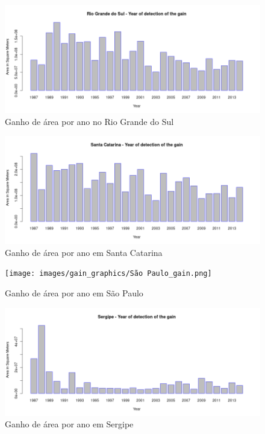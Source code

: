 \begin{figure}[H]
    \centering
    \includegraphics[scale=.5]{images/gain_graphics/Rio Grande do Sul_gain.png}
    \caption{Ganho de área por ano no Rio Grande do Sul}
    \label{fig:gain_rio_grande_do_sul}
\end{figure}

\begin{figure}[H]
    \centering
    \includegraphics[scale=.5]{images/gain_graphics/Santa Catarina_gain.png}
    \caption{Ganho de área por ano em Santa Catarina}
    \label{fig:gain_santa_catarina}
\end{figure}

\begin{figure}[H]
    \centering
    \texttt{[image: images/gain\_graphics/São Paulo\_gain.png]}
    \caption{Ganho de área por ano em São Paulo}
    \label{fig:gain_sao_paulo}
\end{figure}

\begin{figure}[H]
    \centering
    \includegraphics[scale=.5]{images/gain_graphics/Sergipe_gain.png}
    \caption{Ganho de área por ano em Sergipe}
    \label{fig:gain_sergipe}
\end{figure}